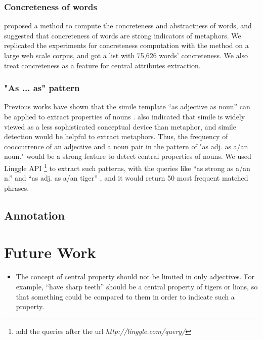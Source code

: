 \subsubsection{Concreteness of words}
 proposed a method to compute the concreteness and abstractness of words, and suggested that concreteness of words are strong indicators of metaphors. 
We replicated the experiments for concreteness computation with the method on a large web scale corpus, and got a list with 75,626 words' concreteness.
We also treat concreteness as a feature for central attributes extraction.

\subsubsection{"As ... as" pattern}
Previous works have shown that the simile template ``as adjective as noun'' can be applied to extract properties of nouns \cite{roncero2006similes, veale2007learning, li2015chinese}.
 also indicated that simile is widely viewed as a less sophisticated conceptual device than metaphor, and simile detection would be helpful to extract metaphors. 
Thus, the frequency of cooccurrence of an adjective and a noun pair in the pattern of "as adj. as a/an noun." would be a strong feature to detect central properties of nouns. 
We used Linggle API \cite{boisson2013linggle} \footnote{add the queries after the url {\sl http://linggle.com/query/}} to extract such patterns, with the queries like ``as strong as a/an n.''  and ``as adj. as a/an tiger'' , and it would return 50 most frequent matched phrases.



\subsection{Annotation}  %



\section{Future Work}
\begin{itemize}
\item The concept of central property should not be limited in only adjectives. For example, ``have sharp teeth'' should be a central property of tigers or lions, so that something could be compared to them in order to indicate such a property.
\end{itemize}